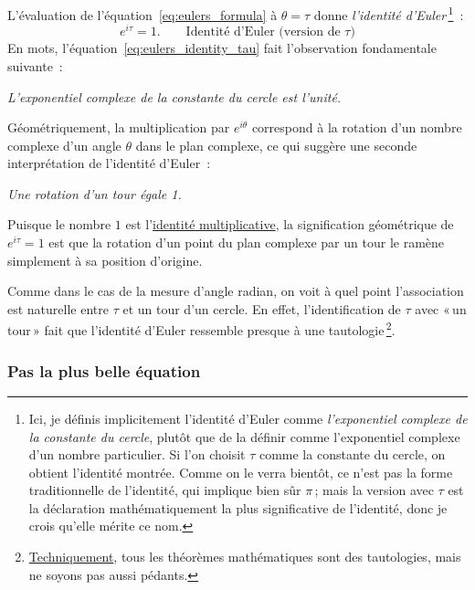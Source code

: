 L'évaluation de l'équation~\eqref{eq:eulers_formula} à $\theta = \tau$ donne
\emph{l'identité d'Euler}\,\footnote{Ici, je définis implicitement l'identité
d'Euler comme \emph{l'exponentiel complexe de la constante du cercle}, plutôt
que de la définir comme l'exponentiel complexe d'un nombre particulier. Si l'on
choisit $\tau$ comme la constante du cercle, on obtient l'identité montrée.
Comme on le verra bientôt, ce n'est pas la forme traditionnelle de l'identité,
qui implique bien sûr $\pi$\,; mais la version avec $\tau$ est la déclaration
mathématiquement la plus significative de l'identité, donc je crois qu'elle
mérite ce nom.}~:
\begin{equation}
\label{eq:eulers_identity_tau}
e^{i\tau} = 1. \qquad\mbox{Identité d'Euler (version de $\tau$)}
\end{equation}
En mots, l'équation~\eqref{eq:eulers_identity_tau} fait l'observation
fondamentale suivante~:

\begin{center}
\emph{L'exponentiel complexe de la constante du cercle est l'unité.}
\end{center}

Géométriquement, la multiplication par $e^{i\theta}$ correspond à la rotation
d'un nombre complexe d'un angle $\theta$ dans le plan complexe, ce qui suggère
une seconde interprétation de l'identité d'Euler~:

\begin{center}
\emph{Une rotation d'un tour égale 1.}
\end{center}

\noindent Puisque le nombre $1$ est
l'\href{https://fr.wikipedia.org/wiki/%C3%89l%C3%A9ment_neutre}{identité
multiplicative}, la signification géométrique de $e^{i\tau} = 1$ est que la
rotation d'un point du plan complexe par un tour le ramène simplement à sa
position d'origine.

Comme dans le cas de la mesure d'angle radian, on voit à quel point
l'association est naturelle entre $\tau$ et un tour d'un cercle. En effet,
l'identification de $\tau$ avec «\,un tour\,» fait que l'identité d'Euler
ressemble presque à une
tautologie\,\footnote{\href{https://bit.ly/32mB2CF}{Techniquement}, tous les
théorèmes mathématiques sont des tautologies, mais ne soyons pas aussi
pédants.}.

    \subsubsection{Pas la plus belle équation} %
    \label{sec:not_the_most_beautiful_equation}

